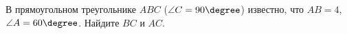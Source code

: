 \begin{ex}
	\begin{condition}
		В прямоугольном треугольнике \( ABC \) (\( \angle C = 90\degree \)) известно, что \( AB = 4 \), \( \angle A = 60\degree \). Найдите \( BC  \) и \( AC \).
	\end{condition}
\end{ex}